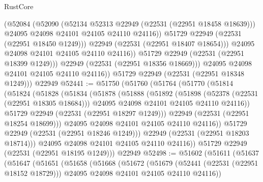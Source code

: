 \begin{lexlean}{RustCore}
\begin{coremodule}
                      (@52084
                        (@52090
                          (@52134 @52313 @22949 (@22531 (@22951 @18458 @18639)))
                          @24095
                          @24098
                          @24101
                          @24105
                          @24110
                          @24116))
                      @51729
                      @22949
                      (@22531 (@22951 @18450 @1249)))
                    @22949
                    (@22531 (@22951 @18407 @18654)))
                  @24095
                  @24098
                  @24101
                  @24105
                  @24110
                  @24116))
              @51729
              @22949
              (@22531 (@22951 @18399 @1249)))
            @22949
            (@22531 (@22951 @18356 @18669)))
          @24095
          @24098
          @24101
          @24105
          @24110
          @24116))
      @51729
      @22949
      (@22531 (@22951 @18348 @1249)))
    @22949
@52441 := @51750
    (@51760
      (@51764
        (@51770
          (@51814
            (@51824
              (@51828
                (@51834
                  (@51878
                    (@51888
                      (@51892
                        (@51898
                          (@52378 (@22531 (@22951 @18305 @18684)))
                          @24095
                          @24098
                          @24101
                          @24105
                          @24110
                          @24116))
                      @51729
                      @22949
                      (@22531 (@22951 @18297 @1249)))
                    @22949
                    (@22531 (@22951 @18254 @18699)))
                  @24095
                  @24098
                  @24101
                  @24105
                  @24110
                  @24116))
              @51729
              @22949
              (@22531 (@22951 @18246 @1249)))
            @22949
            (@22531 (@22951 @18203 @18714)))
          @24095
          @24098
          @24101
          @24105
          @24110
          @24116))
      @51729
      @22949
      (@22531 (@22951 @18195 @1249)))
    @22949
@52498 := @51602
    (@51611
      (@51637
        (@51647
          (@51651
            (@51658
              (@51668
                (@51672
                  (@51679
                    (@52441 (@22531 (@22951 @18152 @18729)))
                    @24095
                    @24098
                    @24101
                    @24105
                    @24110
                    @24116))

\end{coremodule}
\end{lexlean}
